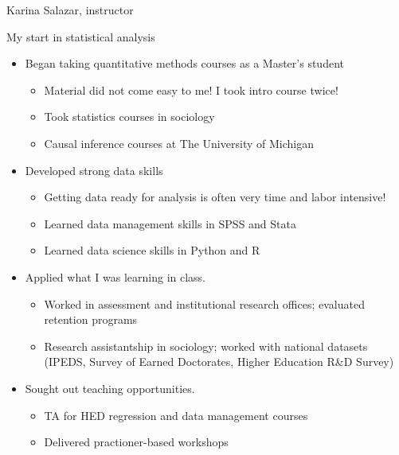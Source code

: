 \documentclass[
  8pt,
  ignorenonframetext,
  dvipsnames]{beamer}
\providecommand{\tightlist}{%
  \setlength{\itemsep}{0pt}\setlength{\parskip}{0pt}}
\let\olditem\item
\renewcommand{\item}{%
  \olditem\vspace{4pt}
}
\begin{document}
\begin{frame}{Karina Salazar, instructor}
\protect\hypertarget{karina-salazar-instructor}{}

My start in statistical analysis

\begin{itemize}
\tightlist
\item
  Began taking quantitative methods courses as a Master's student

  \begin{itemize}
  \tightlist
  \item
    Material did not come easy to me! I took intro course twice!
  \item
    Took statistics courses in sociology
  \item
    Causal inference courses at The University of Michigan
  \end{itemize}
\end{itemize}

\medskip

\begin{itemize}
\tightlist
\item
  Developed strong data skills

  \begin{itemize}
  \tightlist
  \item
    Getting data ready for analysis is often very time and labor
    intensive!
  \item
    Learned data management skills in SPSS and Stata
  \item
    Learned data science skills in Python and R
  \end{itemize}
\end{itemize}

\medskip

\begin{itemize}
\tightlist
\item
  Applied what I was learning in class.

  \begin{itemize}
  \tightlist
  \item
    Worked in assessment and institutional research offices; evaluated
    retention programs
  \item
    Research assistantship in sociology; worked with national datasets
    (IPEDS, Survey of Earned Doctorates, Higher Education R\&D Survey)
  \end{itemize}
\end{itemize}

\medskip

\begin{itemize}
\tightlist
\item
  Sought out teaching opportunities.

  \begin{itemize}
  \tightlist
  \item
    TA for HED regression and data management courses
  \item
    Delivered practioner-based workshops
  \end{itemize}
\end{itemize}

\end{frame}
\end{document}
